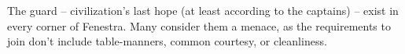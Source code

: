 \begin{multicols}{2}
\label{human_soldier}

The \gls{guard} -- civilization's last hope (at least according to the captains) -- exist in every corner of Fenestra.
Many consider them a menace, as the requirements to join don't include table-manners, common courtesy, or cleanliness.


\end{multicols}

